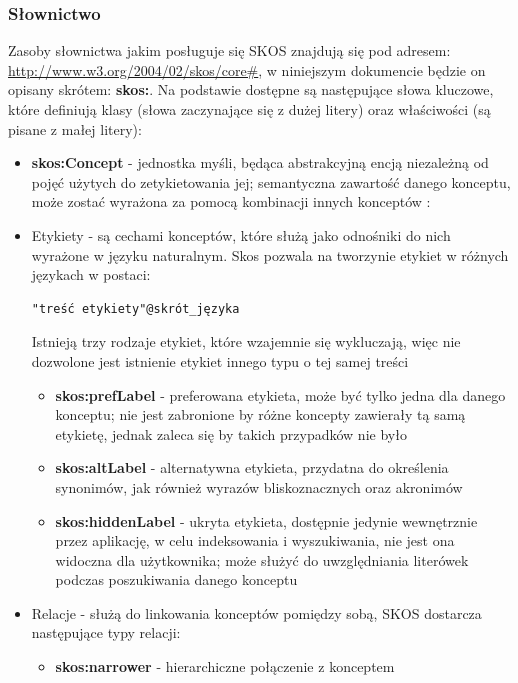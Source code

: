 \documentclass[12pt,a4paper,notitlepage]{article}
\begin{document}
\subsubsection{Słownictwo}
Zasoby słownictwa jakim posługuje się SKOS znajdują się pod adresem:
\url{http://www.w3.org/2004/02/skos/core#}, w niniejszym dokumencie będzie on
opisany skrótem: \textbf{skos:}. Na podstawie \cite{SKOS-pr} dostępne są
następujące słowa kluczowe, które definiują klasy (słowa zaczynające się z
dużej litery) oraz właściwości (są pisane z małej litery):
\begin{itemize}
  \item \textbf{skos:Concept} - jednostka myśli, będąca abstrakcyjną encją
    niezależną od pojęć użytych do zetykietowania jej; semantyczna zawartość
    danego konceptu, może zostać wyrażona za pomocą kombinacji innych konceptów
    \cite{Willpower}:
  \item Etykiety - są cechami konceptów, które służą jako odnośniki do nich
    wyrażone w języku naturalnym. Skos pozwala na tworzynie etykiet w różnych
    językach w postaci:
\begin{verbatim}
"treść etykiety"@skrót_języka
\end{verbatim}
    Istnieją trzy rodzaje etykiet, które wzajemnie się wykluczają, więc nie
    dozwolone jest istnienie etykiet innego typu o tej samej treści
    \begin{itemize}
      \item \textbf{skos:prefLabel} - preferowana etykieta, może być tylko
        jedna dla danego konceptu; nie jest zabronione by różne koncepty
        zawierały tą samą etykietę, jednak zaleca się by takich przypadków
        nie było
      \item \textbf{skos:altLabel} - alternatywna etykieta, przydatna do
        określenia synonimów, jak również wyrazów bliskoznacznych oraz
        akronimów
      \item \textbf{skos:hiddenLabel} - ukryta etykieta, dostępnie jedynie
        wewnętrznie przez aplikację, w celu indeksowania i wyszukiwania, nie
        jest ona widoczna dla użytkownika; może służyć do uwzględniania
        literówek podczas poszukiwania danego konceptu
    \end{itemize}
  \item Relacje - służą do linkowania konceptów pomiędzy sobą, SKOS dostarcza
    następujące typy relacji:
    \begin{itemize}
      \item \textbf{skos:narrower} - hierarchiczne połączenie z konceptem

\end{itemize}
\end{itemize}
\end{document}
